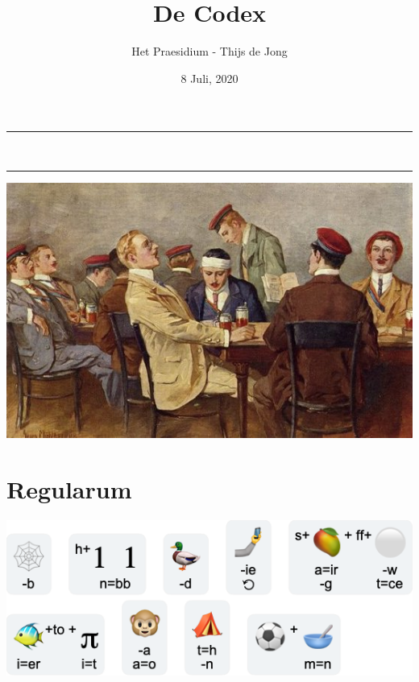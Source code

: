 \documentclass[10pt]{article}
\title{De Codex}
\date{{8 Juli, 2020}}
\author{Het Praesidium - Thijs de Jong} %
\begin{document}
\begin{titlepage}
\centering
\vspace*{0.5cm}
\hrule
\vspace{0.4cm}
{\LARGE \textsc{\thetitle}}\\[0.4cm]
\vspace{0.4cm}
\hrule
\vspace{15mm}

\includegraphics[scale=0.5]{image.jpg}  %

\vfill
\vspace{1.5cm}
{\Large \thedate}
\vspace{2cm}
\end{titlepage}
\thispagestyle{empty}

\newpage
\vspace{1cm}
\setcounter{secnumdepth}{-1}
\tableofcontents
\renewcommand{\baselinestretch}{1.0}\normalsize
\newpage

\section{Regularum}
\footnotesize

\vspace{1cm}
\centering
\includegraphics[scale=0.6]{songs/en/rebus-4.png}  %
\end{document}
